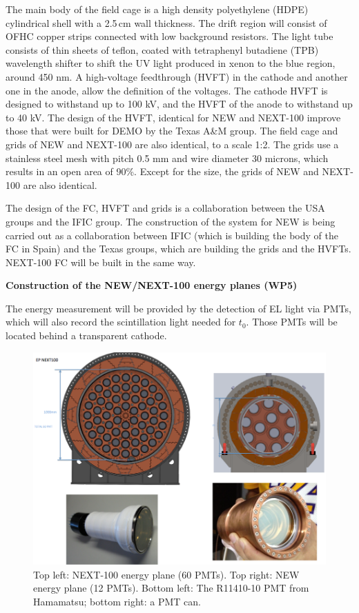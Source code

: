 The main body of the field cage is a high density polyethylene (HDPE) cylindrical shell with a 2.5\,cm wall thickness.  The drift region will consist of OFHC copper strips connected with low background resistors.  The light tube consists of thin sheets of teflon, coated with tetraphenyl butadiene (TPB) wavelength shifter to shift the UV light produced in xenon to the blue region, around 450 nm.  A high-voltage feedthrough (HVFT) in the cathode and another one in the anode, allow the definition of the voltages. The cathode HVFT is designed to withstand up to 100 kV, and the HVFT of the anode to withstand up to 40 kV. The design of the HVFT, identical for NEW and NEXT-100 improve those that were built for DEMO by the Texas A\&M group. The field cage and grids of NEW and NEXT-100 are also identical, to a scale 1:2. The grids use a stainless steel mesh with pitch 0.5 mm and wire diameter 30 microns, which results in an open area of 90\%. Except for the size, the grids of NEW and NEXT-100 are also identical.   

The design of the FC, HVFT and grids is a collaboration between the USA groups and the IFIC group. The construction of the system for NEW is being carried out as a collaboration between IFIC (which is building the body of the FC in Spain) and the Texas groups, which are building the grids and the HVFTs. NEXT-100 FC will be built in the same way. 

{\bf Construction of the NEW/NEXT-100 energy planes (WP5)}

The energy measurement will be provided by the detection of EL light via PMTs, which will also record the scintillation light needed for $t_0$. Those PMTs will be located behind a transparent cathode.

\begin{figure}[t!b!]
\begin{center}
\includegraphics[width=.9\textwidth]{img/EPNext-100.png}
\end{center}
\caption{Top left: NEXT-100 energy plane (60 PMTs). Top right: NEW energy plane (12 PMTs).
Bottom left: The R11410-10 PMT from Hamamatsu; bottom right: a PMT can.} \label{fig:EnergyPlane}
\end{figure}



